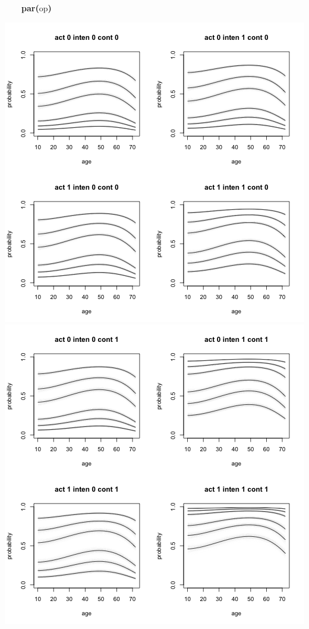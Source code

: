 \documentclass{article}
\makeatletter
\newcommand{\hlfunctioncall}[1]{\textcolor[rgb]{.5,0,.33}{\textbf{#1}}}%
\newcommand{\hlkeyword}[1]{\textbf{#1}}%
\newcommand{\hlsymbol}[1]{#1}%
\newcommand{\hlstd}[1]{\textcolor[rgb]{0,0,0}{#1}}%
\newenvironment{kframe}{%
 \def\FrameCommand##1{\hskip\@totalleftmargin \hskip-\fboxsep
 \colorbox{shadecolor}{##1}\hskip-\fboxsep
     \hskip-\linewidth \hskip-\@totalleftmargin \hskip\columnwidth}%
 \MakeFramed {\advance\hsize-\width
   \@totalleftmargin\z@ \linewidth\hsize
   \@setminipage}}%
 {\par\unskip\endMakeFramed}
\newenvironment{knitrout}{}{} %
\makeatother
\begin{document}
\begin{knitrout}
{\begin{kframe}
\begin{flushleft}
\hlstd{}{\ }{\ }{\ }{\ }{\ }{\ }{\ }{\ }\hlkeyword{\usebox{\hlnormalsizeboxclosebrace}}\hspace*{\fill}\\
\hlstd{}{\ }{\ }{\ }{\ }\hlkeyword{\usebox{\hlnormalsizeboxclosebrace}}\hspace*{\fill}\\
\hlstd{}{\ }{\ }{\ }{\ }\hlfunctioncall{par}\hlkeyword{(}\hlsymbol{op}\hlkeyword{)}\hspace*{\fill}\\
\hlstd{}\hlkeyword{\usebox{\hlnormalsizeboxclosebrace}}\mbox{}
\normalfont
\end{flushleft}
\includegraphics{mod-avg-age1} \includegraphics{mod-avg-age2} \end{kframe}}
\end{knitrout}
\end{document}

